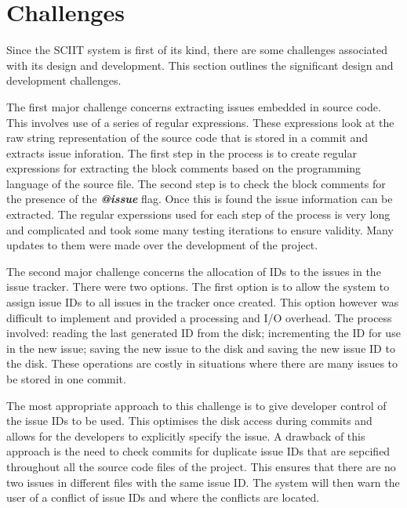 \documentclass{mproj}
\begin{document}
\section{Challenges}


Since the SCIIT system is first of its kind, there are some challenges associated with its design and development. This section outlines the significant design and development challenges.

The first major challenge concerns extracting issues embedded in source code. This involves use of a series of regular expressions. These expressions look at the raw string representation of the source code that is stored in a commit and extracts issue inforation. The first step in the process is to create regular expressions for extracting the block comments based on the programming language of the source file. The second step is to check the block comments for the presence of the \textbf{\textit{@issue}} flag. Once this is found the issue information can be extracted. The regular experssions used for each step of the process is very long and complicated and took some many testing iterations to ensure validity. Many updates to them were made over the development of the project.

The second major challenge concerns the allocation of IDs to the issues in the issue tracker. There were two options. The first option is to allow the system to assign issue IDs to all issues in the tracker once created. This option however was difficult to implement and provided a processing and I/O overhead. The process involved: reading the last generated ID from the disk; incrementing the ID for use in the new issue; saving the new issue to the disk and saving the new issue ID to the disk. These operations are costly in situations where there are many issues to be stored in one commit.

The most appropriate approach to this challenge is to give developer control of the issue IDs to be used. This optimises the disk access during commits and allows for the developers to explicitly specify the issue. A drawback of this approach is the need to check commits for duplicate issue IDs that are sepcified throughout all the source code files of the project. This ensures that there are no two issues in different files with the same issue ID. The system will then warn the user of a conflict of issue IDs and where the conflicts are located.
\end{document}
